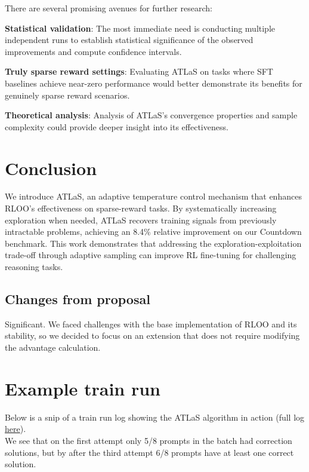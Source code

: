 \documentclass{article}
\begin{document}
There are several promising avenues for further research:

\textbf{Statistical validation}: The most immediate need is conducting multiple independent runs to establish statistical significance of the observed improvements and compute confidence intervals.

\textbf{Truly sparse reward settings}: Evaluating ATLaS on tasks where SFT baselines achieve near-zero performance would better demonstrate its benefits for genuinely sparse reward scenarios.

\textbf{Theoretical analysis}: Analysis of ATLaS's convergence properties and sample complexity could provide deeper insight into its effectiveness.

\section{Conclusion}

We introduce ATLaS, an adaptive temperature control mechanism that enhances RLOO's effectiveness on sparse-reward tasks. By systematically increasing exploration when needed, ATLaS recovers training signals from previously intractable problems, achieving an 8.4\% relative improvement on our Countdown benchmark. This work demonstrates that addressing the exploration-exploitation trade-off through adaptive sampling can improve RL fine-tuning for challenging reasoning tasks.

\subsection{Changes from proposal}

Significant. We faced challenges with the base implementation of RLOO and its stability, so we decided to focus on an extension that does not require modifying the advantage calculation.




\appendix

\section{Example train run}
\label{app:log}

Below is a snip of a train run log showing the ATLaS algorithm in action (full log \href{https://wandb.ai/jonathanalgar/countdown-rl-prod/runs/o14gnkyy/logs}{here}).\\
We see that on the first attempt only 5/8 prompts in the batch had correction solutions, but by after the third attempt 6/8 prompts have at least one correct solution. 
\end{document}
